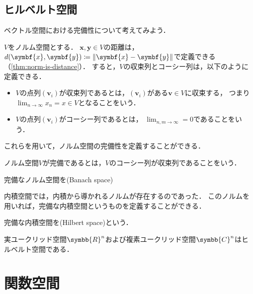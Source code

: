 \documentclass{sotsu}
\begin{document}
\subsection{ヒルベルト空間}

ベクトル空間における完備性について考えてみよう．

$V$をノルム空間とする．
$\symbf{x}, \symbf{y} \in V$の距離は，
$d(\symbf{x}, \symbf{y}) \coloneq \norm{\symbf{x} - \symbf{y}}$で定義できる（\cref{thm:norm-is-distance}）．
すると，$V$の収束列とコーシー列は，以下のように定義できる．
\begin{itemize}
    \item $V$の点列$(\symbf{v}_i)$が収束列であるとは，$(\symbf{v}_i)$がある$\symbf{v} \in V$に収束する，
        つまり$\lim_{n \to \infty} x_n = x \in V$となることをいう．
    \item $V$の点列$(\symbf{v}_i)$がコーシー列であるとは，
        $\lim_{n, m \to \infty} = 0$であることをいう．
\end{itemize}
これらを用いて，ノルム空間の完備性を定義することができる．

\begin{definition}
    ノルム空間$V$が完備であるとは，$V$のコーシー列が収束列であることをいう．
\end{definition}

\begin{definition}[バナッハ空間]
    \label{dfn:Banach-space}
    完備なノルム空間を(Banach space)
\end{definition}

内積空間では，内積から導かれるノルムが存在するのであった．
このノルムを用いれば，完備な内積空間というものを定義することができる．

\begin{definition}[ヒルベルト空間]
    \label{dfn:Hilbert-space}
    完備な内積空間を(Hilbert space)という．
\end{definition}

\begin{proposition}
    実ユークリッド空間$\symbb{R}^n$および複素ユークリッド空間$\symbb{C}^n$はヒルベルト空間である．
\end{proposition}



\section{関数空間}
\end{document}
